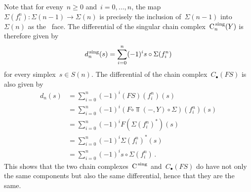 Note that for eveny~$n \geq 0$ and~$i = 0, \dotsc, n$, the map~$\Sigma(f^n_i) \colon \Sigma(n-1) \to \Sigma(n)$ is precisely the inclusion of~$\Sigma(n-1)$ into~$\Sigma(n)$ as the~ face.
The differential of the singular chain complex~$\operatorname{C}^{\,\mathrm{sing}}_n(Y)$ is therefore given by
\[
    d^{\,\mathrm{sing}}_n(s)
  = \sum_{i=0}^n (-1)^i s \circ \Sigma(f^n_i)
\]
for every simplex~$s \in S(n)$.
The differential of the chain complex~$C_\bullet(FS)$ is also given by
\begin{align*}
      d_n(s)
  &=  \sum_{i=0}^n (-1)^i (FS)(f^n_i)(s)  \\
  &=  \sum_{i=0}^n (-1)^i (F \circ \Top(-,Y) \circ \Sigma)(f^n_i)(s)  \\
  &=  \sum_{i=0}^n (-1)^i F( \Sigma(f^n_i)^* )(s) \\
  &=  \sum_{i=0}^n (-1)^i \Sigma(f^n_i)^*(s)  \\
  &=  \sum_{i=0}^n (-1)^i s \circ \Sigma(f^n_i) \,.
\end{align*}
This shows that the two chain complexes~$\operatorname{C}^{\,\mathrm{sing}}$ and~$C_\bullet(FS)$ do have not only the same components but also the same differential, hence that they are the same.


